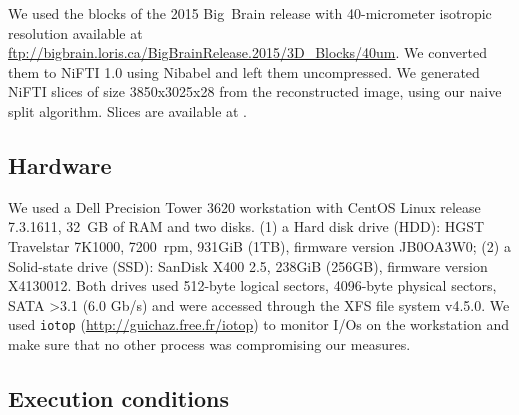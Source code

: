 \documentclass[10pt, conference, compsocconf]{IEEEtran}
\newcommand{\todo}[1]{\marginpar{\parbox{18mm}{\flushleft\tiny\color{red}\textbf{TODO}:
      #1}}}
\begin{document}
We used the blocks of the 2015 Big~Brain release with 40-micrometer
isotropic resolution available at
\url{ftp://bigbrain.loris.ca/BigBrainRelease.2015/3D\_Blocks/40um}. We
converted them to NiFTI 1.0 using Nibabel and left them uncompressed.
We generated NiFTI slices of size 3850x3025x28 from the reconstructed
image, using our naive split algorithm. Slices are available at
\todo{\url{x}}.

\subsection{Hardware}

We used a Dell Precision Tower 3620 workstation with CentOS Linux
release 7.3.1611, 32~GB of RAM and two disks. (1) a Hard disk drive
(HDD): HGST Travelstar 7K1000, 7200~rpm, 931GiB (1TB), firmware
version JB0OA3W0; (2) a Solid-state drive (SSD): SanDisk X400 2.5,
238GiB (256GB), firmware version X4130012.  Both drives used 512-byte
logical sectors, 4096-byte physical sectors, SATA \textgreater 3.1 (6.0 Gb/s) and
were accessed through the XFS file system v4.5.0. We used
\texttt{iotop} (\url{http://guichaz.free.fr/iotop}) to monitor I/Os on
the workstation and make sure that no other process was compromising
our measures.

\subsection{Execution conditions}
\end{document}
